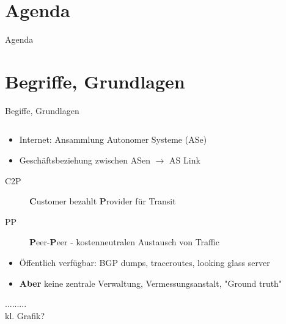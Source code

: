 \documentclass[ngerman,compress,hyperref={bookmarks}]{beamer}
\begin{document}
\section*{Agenda}
\begin{frame}{Agenda} \setcounter{tocdepth}{1} \tableofcontents[part=1] \setcounter{tocdepth}{3} \end{frame}

\section{Begriffe, Grundlagen}
\begin{frame}{Begiffe, Grundlagen}
  \begin{columns}[c]
    \begin{column}{0.75\textwidth}
      \begin{itemize}
        \item Internet: Ansammlung Autonomer Systeme (ASe)
        \item Geschäftsbeziehung zwischen ASen $\rightarrow$ AS Link
      \end{itemize}
      \begin{description}
        \item[C2P] \textbf{C}ustomer bezahlt \textbf{P}rovider für Transit
        \item[PP] \textbf{P}eer-\textbf{P}eer - kostenneutralen Austausch von Traffic
      \end{description}
      \begin{itemize}
        \item Öffentlich verfügbar: BGP dumps, traceroutes, looking glass server
        \item \textbf{Aber} keine zentrale Verwaltung, Vermessungsanstalt, "Ground truth"
      \end{itemize}
      ......... \\
      kl. Grafik?
    \end{column}
  \end{columns}
\end{frame}
\end{document}
